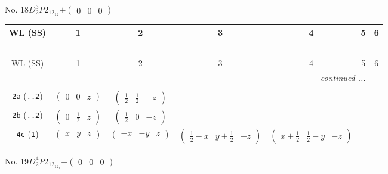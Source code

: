 \documentclass[fleqn,9pt,landscape]{jsarticle}
\begin{document}
\newpage
No. 18\quad$D_{2}^{3}$\quad$P2_12_12$\quad[ orthorhombic ]\quad$+\begin{pmatrix} 0 & 0 & 0 \end{pmatrix}$
\begin{center}
\renewcommand{\arraystretch}{1.2}
\begin{longtable}{ccccccc}
 \hline \hline
WL (SS) & 1 & 2 & 3 & 4 & 5 & 6 \\ \hline \endfirsthead

\multicolumn{6}{l}{\tablename\ \thetable{}} \\
 \hline \hline
WL (SS) & 1 & 2 & 3 & 4 & 5 & 6 \\ \hline \endhead

 \hline \hline
\multicolumn{6}{r}{\footnotesize\it continued ...} \\ \endfoot

 \hline \hline
\multicolumn{6}{r}{} \\ \endlastfoot

{\tt 2a} ({\tt ..2}) & $ \begin{pmatrix} 0 & 0 & z \end{pmatrix} $ & $ \begin{pmatrix} \frac{1}{2} & \frac{1}{2} & - z \end{pmatrix} $ & $  $ & $  $ \\ \hline
{\tt 2b} ({\tt ..2}) & $ \begin{pmatrix} 0 & \frac{1}{2} & z \end{pmatrix} $ & $ \begin{pmatrix} \frac{1}{2} & 0 & - z \end{pmatrix} $ & $  $ & $  $ \\ \hline
{\tt 4c} ({\tt 1}) & $ \begin{pmatrix} x & y & z \end{pmatrix} $ & $ \begin{pmatrix} - x & - y & z \end{pmatrix} $ & $ \begin{pmatrix} \frac{1}{2} - x & y + \frac{1}{2} & - z \end{pmatrix} $ & $ \begin{pmatrix} x + \frac{1}{2} & \frac{1}{2} - y & - z \end{pmatrix} $ \\
\end{longtable}
\end{center}
\newpage
No. 19\quad$D_{2}^{4}$\quad$P2_12_12_1$\quad[ orthorhombic ]\quad$+\begin{pmatrix} 0 & 0 & 0 \end{pmatrix}$
\end{document}
